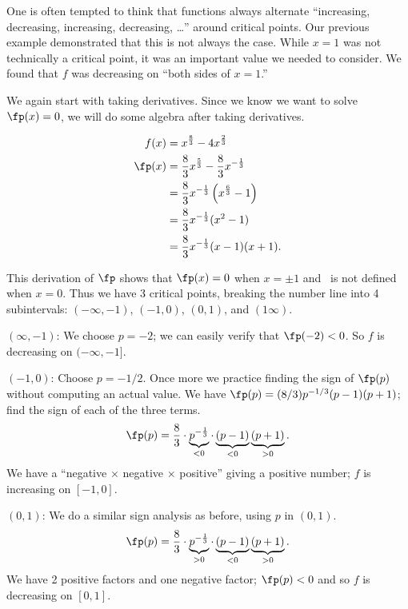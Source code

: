 One is often tempted to think that functions always alternate ``increasing, decreasing, increasing, decreasing, \ldots'' around critical points. Our previous example demonstrated that this is not always the case. While $x=1$ was not technically a critical point, it was an important value we needed to consider. We found that $f$ was decreasing on ``both sides of $x=1$.''

{We again start with taking derivatives. Since we know we want to solve $\fp(x) = 0$, we will do some algebra after taking derivatives.

\begin{align*}
f(x) &= x^{\frac{8}{3}}-4x^{\frac{2}{3}} \\
\fp(x) &= \frac83 x^{\frac53} - \frac83x^{-\frac13}\\
	&= \frac83x^{-\frac13}\left(x^{\frac63}-1\right)\\
	&=\frac83x^{-\frac13}(x^2-1)\\
	&=\frac83x^{-\frac13}(x-1)(x+1).
\end{align*}

This derivation of $\fp$ shows that $\fp(x) = 0$ when $x=\pm 1$ and \fp\ is not defined when $x=0$. Thus we have 3 critical points, breaking the number line into 4 subintervals: $(-\infty,-1)$, $(-1,0)$, $(0,1)$, and $(1\infty)$.

\iflatexml\begin{description}\else\begin{description}[leftmargin=0pt]\fi
\item[Interval 1,] $(\infty,-1)$: We choose $p=-2$; we can easily verify that $\fp(-2)<0$. So $f$ is decreasing on $(-\infty,-1]$.

\item[Interval 2,] $(-1,0)$: Choose $p=-1/2$. Once more we practice finding the sign of $\fp(p)$ without computing an actual value. We have $\fp(p) = (8/3)p^{-1/3}(p-1)(p+1)$; find the sign of each of the three terms. 
	\[\fp(p) = \frac 83 \cdot \underbrace{p^{-\frac13}}_{<0}\cdot \underbrace{(p-1)}_{<0}\underbrace{(p+1)}_{>0}.\]
	We have a ``negative $\times$ negative $\times$ positive'' giving a positive number; $f$ is increasing on $[-1,0]$.

\item[Interval 3,] $(0,1)$: We do a similar sign analysis as before, using $p$ in $(0,1)$.
	\[\fp(p) = \frac 83 \cdot \underbrace{p^{-\frac13}}_{>0}\cdot \underbrace{(p-1)}_{<0}\underbrace{(p+1)}_{>0}.\]
	We have 2 positive factors and one negative factor; $\fp(p)<0$ and so $f$ is decreasing on $[0,1]$.


\end{description}
\end{description}}
